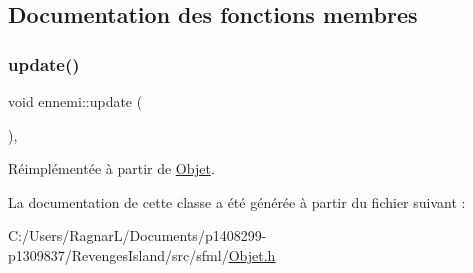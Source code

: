 \subsection{Documentation des fonctions membres}
\mbox{\label{classennemi_a52bb08c9e3c5597d0019857dc43f3351}} 
\subsubsection{\texorpdfstring{update()}{update()}}
{\footnotesize\ttfamily void ennemi\+::update (\begin{DoxyParamCaption}{ }\end{DoxyParamCaption})\hspace{0.3cm}{\ttfamily [inline]}, {\ttfamily [virtual]}}



Réimplémentée à partir de \hyperlink{class_objet_a684611b20eb6e6df5e4743dd3e42385a}{Objet}.



La documentation de cette classe a été générée à partir du fichier suivant \+:\begin{DoxyCompactItemize}
\item 
C\+:/\+Users/\+Ragnar\+L/\+Documents/p1408299-\/p1309837/\+Revenges\+Island/src/sfml/\hyperlink{_objet_8h}{Objet.\+h}\end{DoxyCompactItemize}
